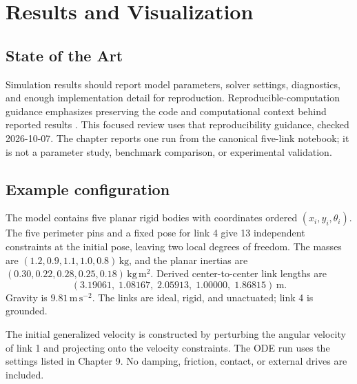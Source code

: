 \documentclass[../main.tex]{subfiles}
\begin{document}
\chapter{Results and Visualization}
\label{chap:results}

\section{State of the Art}
Simulation results should report model parameters, solver settings, diagnostics, and enough implementation detail for reproduction. Reproducible-computation guidance emphasizes preserving the code and computational context behind reported results \cite{sandve2013reproducible}. This focused review uses that reproducibility guidance, checked 2026-10-07. The chapter reports one run from the canonical five-link notebook; it is not a parameter study, benchmark comparison, or experimental validation.

\section{Example configuration}
The model contains five planar rigid bodies with coordinates ordered \((x_i,y_i,\theta_i)\). The five perimeter pins and a fixed pose for link 4 give 13 independent constraints at the initial pose, leaving two local degrees of freedom. The masses are \((1.2,0.9,1.1,1.0,0.8)\,\mathrm{kg}\), and the planar inertias are \((0.30,0.22,0.28,0.25,0.18)\,\mathrm{kg\,m^2}\). Derived center-to-center link lengths are
\begin{equation*}
 (3.19061,\;1.08167,\;2.05913,\;1.00000,\;1.86815)\,\mathrm{m}.
\end{equation*}
Gravity is \(9.81\,\mathrm{m\,s^{-2}}\). The links are ideal, rigid, and unactuated; link 4 is grounded.

The initial generalized velocity is constructed by perturbing the angular velocity of link 1 and projecting onto the velocity constraints. The ODE run uses the settings listed in Chapter 9. No damping, friction, contact, or external drives are included.
\end{document}
